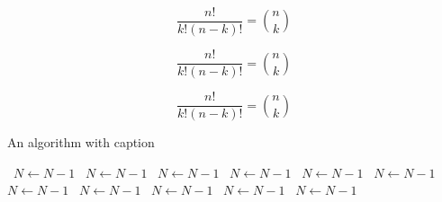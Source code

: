 \documentclass[a4paper]{article}
\begin{document}
\[ \frac{n!}{k!(n-k)!} = \binom{n}{k} \]

\[ \frac{n!}{k!(n-k)!} = \binom{n}{k} \]

\[ \frac{n!}{k!(n-k)!} = \binom{n}{k} \]

\begin{algorithm}
\caption{An algorithm with caption}
\begin{algorithmic}
\    \State $N \gets N - 1$
\    \State $N \gets N - 1$
\    \State $N \gets N - 1$
\    \State $N \gets N - 1$
\    \State $N \gets N - 1$
\    \State $N \gets N - 1$
\    \State $N \gets N - 1$
\    \State $N \gets N - 1$
\    \State $N \gets N - 1$
\    \State $N \gets N - 1$
\    \State $N \gets N - 1$
\EndWhile
\end{algorithmic}
\end{algorithm}
\end{document}
